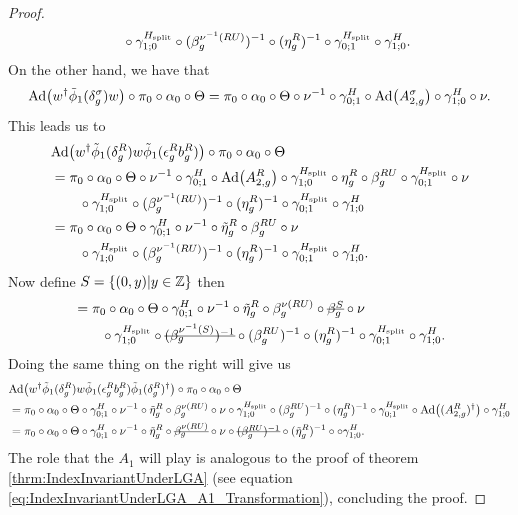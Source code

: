 \documentclass[11pt,a4paper,twoside]{article}
\numberwithin{equation}{section}
\begin{document}
\begin{proof}
\begin{align}
			\nonumber
			&\qquad \circ\gamma^{{H_{\text{split}}}}_{1;0}\circ(\beta_g^{\nu^{-1}(RU)})^{-1}\circ(\eta_g^R)^{-1}\circ\gamma^{{H_{\text{split}}}}_{0;1}\circ\gamma^{H}_{1;0}.
		\end{align}
		On the other hand, we have that
		\begin{equation}
			\Ad{w^\dagger \phiTilde_1(\delta_g^\sigma)w}\circ\pi_0\circ\alpha_0\circ\Theta=\pi_0\circ\alpha_0\circ\Theta\circ\nu^{-1}\circ\gamma^H_{0;1}\circ\Ad{A^\sigma_{2,g}}\circ\gamma^H_{1;0}\circ\nu.
		\end{equation}
		This leads us to
		\begin{align}
			&\Ad{w^\dagger\phiTilde_1(\delta_g^R)w\phiTilde_1(\epsilon_g^R b_g^R)}\circ\pi_0\circ\alpha_0\circ\Theta\\
			&=\pi_0\circ\alpha_0\circ\Theta\circ\nu^{-1}\circ\gamma^H_{0;1}\circ\Ad{A_{2,g}^R}\circ\gamma^{\Hsplit}_{1;0}\circ\eta_g^R\circ\beta_g^{RU}\circ\gamma^{\Hsplit}_{0;1}\circ\nu\\
			\nonumber
			&\qquad \circ\gamma^{\Hsplit}_{1;0}\circ(\beta_g^{\nu^{-1}(RU)})^{-1}\circ(\eta_g^R)^{-1}\circ\gamma^{\Hsplit}_{0;1}\circ\gamma^{H}_{1;0}\\
			&=\pi_0\circ\alpha_0\circ\Theta\circ\gamma^H_{0;1}\circ\nu^{-1}\circ\tilde\eta_g^R\circ\beta_g^{RU}\circ\nu\\
			\nonumber
			&\qquad \circ\gamma^{\Hsplit}_{1;0}\circ(\beta_g^{\nu^{-1}(RU)})^{-1}\circ(\eta_g^R)^{-1}\circ\gamma^{\Hsplit}_{0;1}\circ\gamma^{H}_{1;0}.
		\end{align}
		Now define $S=\{(0,y)|y\in\mathbb Z\}$ then
		\begin{align}
			&=\pi_0\circ\alpha_0\circ\Theta\circ\gamma^H_{0;1}\circ\nu^{-1}\circ\tilde\eta_g^R\circ\beta_g^{\nu(RU)}\circ\stkout{\beta_g^S}\circ\nu\\
			\nonumber
			&\qquad \circ\gamma^{\Hsplit}_{1;0}\circ\stkout{(\beta_g^{\nu^{-1}(S)})^{-1}}\circ(\beta_g^{RU})^{-1}\circ(\eta_g^R)^{-1}\circ\gamma^{\Hsplit}_{0;1}\circ\gamma^{H}_{1;0}.
		\end{align}
		Doing the same thing on the right will give us
		\begin{align}
			&\Ad{w^\dagger\phiTilde_1(\delta_g^R)w\phiTilde_1(\epsilon_g^R b_g^R)\phiTilde_1(\delta_g^R)^\dagger}\circ\pi_0\circ\alpha_0\circ\Theta\\
			&=\pi_0\circ\alpha_0\circ\Theta\circ\gamma^H_{0;1}\circ\nu^{-1}\circ\tilde\eta_g^R\circ\beta_g^{\nu(RU)}\circ\nu\circ\gamma^{\Hsplit}_{1;0}\circ(\beta_g^{RU})^{-1}\circ(\eta_g^R)^{-1}\circ\gamma^{\Hsplit}_{0;1}\circ\Ad{(A_{2,g}^R)^\dagger}\circ\gamma^{H}_{1;0}\\
			&=\pi_0\circ\alpha_0\circ\Theta\circ\gamma^H_{0;1}\circ\nu^{-1}\circ\tilde\eta_g^R\circ\stkout{\beta_g^{\nu(RU)}}\circ\nu\circ\stkout{(\beta_g^{RU})^{-1}}\circ(\tilde\eta_g^R)^{-1}\circ\circ\gamma^{H}_{1;0}.
		\end{align}
		The role that the $A_1$ will play is analogous to the proof of theorem \ref{thrm:IndexInvariantUnderLGA} (see equation \eqref{eq:IndexInvariantUnderLGA_A1_Transformation}), concluding the proof.
	\end{proof}
\end{document}
